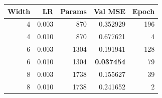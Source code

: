 \begin{center}
\small
\setlength{\tabcolsep}{4pt}
\begin{tabular}{@{}rrrrr@{}}
\toprule
Width & LR & Params & Val MSE & Epoch\\
\midrule
4 & 0.003 & 870 & 0.352929 & 196\\
4 & 0.010 & 870 & 0.677621 & 4\\
6 & 0.003 & 1304 & 0.191941 & 128\\
6 & 0.010 & 1304 & \textbf{0.037454} & 79\\
8 & 0.003 & 1738 & 0.155627 & 39\\
8 & 0.010 & 1738 & 0.241652 & 2\\
\bottomrule
\end{tabular}
\end{center}